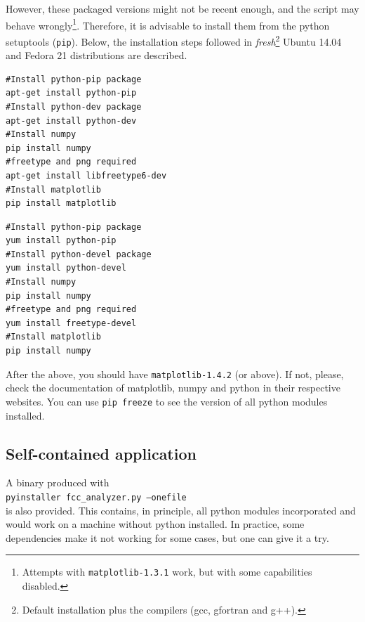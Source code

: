 \documentclass[a4paper,11pt]{article}
\begin{document}
However, these packaged versions might not be recent enough, and the script may behave wrongly\footnote{Attempts with \texttt{matplotlib-1.3.1} work, but with some capabilities disabled.}. Therefore, it is advisable to install them from the python setuptools (\texttt{pip}). Below, the installation steps followed in \textit{fresh}\footnote{Default installation plus the compilers (gcc, gfortran and g++).} Ubuntu 14.04 and Fedora 21 distributions are described.

\begin{minipage}{0.46\textwidth}
 \begin{lstlisting}[label=ubuntu_install,caption=Installing \texttt{matplotlib} in Ubuntu 14.04.]
#Install python-pip package
apt-get install python-pip
#Install python-dev package
apt-get install python-dev
#Install numpy
pip install numpy
#freetype and png required
apt-get install libfreetype6-dev
#Install matplotlib
pip install matplotlib
 \end{lstlisting}
\end{minipage}
\hspace*{0.1cm}
\begin{minipage}{0.46\textwidth}
  \begin{lstlisting}[label=fedora_install,caption=Installing \texttt{matplotlib} in Fedora 21.]
#Install python-pip package
yum install python-pip
#Install python-devel package
yum install python-devel
#Install numpy
pip install numpy
#freetype and png required
yum install freetype-devel
#Install matplotlib
pip install numpy
 \end{lstlisting}
\end{minipage}

After the above, you should have \texttt{matplotlib-1.4.2} (or above). If not, please, check the documentation of matplotlib, numpy and python in their respective websites. You can use \texttt{pip freeze} to see the version of all python modules installed.

\subsection{Self-contained application}
A binary produced with\\
\texttt{pyinstaller fcc\_analyzer.py --onefile}\\ is also provided. This contains, in principle, all python modules incorporated and 
would work on a machine without python installed. In practice, some dependencies make it not working for some cases, but one can give it a try.
\end{document}

